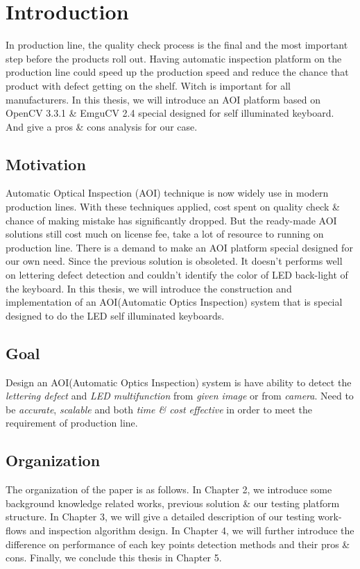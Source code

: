 \chapter{Introduction}
\label{c:intro}
	In production line, the quality check process is the final and the most important step before the
	products roll out.  
	Having automatic inspection platform on the production line could speed up the production speed and reduce the chance that product with defect getting on the shelf. 
	Witch is important for all manufacturers.
	In this thesis, we will introduce an AOI platform based on OpenCV 3.3.1 \& EmguCV 2.4 special designed for self illuminated keyboard.
	And give a pros \& cons analysis for our case.


\section{Motivation} \label{section:motivation} 
	Automatic Optical Inspection (AOI) technique is now widely use in modern production lines.
	With these techniques applied, cost spent on quality check \& chance of making mistake has significantly dropped.
	But the ready-made AOI solutions still cost much on license fee, take a lot of resource to running on production line.
	There is a demand to make an AOI platform special designed for our own need.
	Since the previous solution is obsoleted. It doesn't performs well on
	lettering defect detection and couldn't identify the color of LED back-light
	of the keyboard. In this thesis, we will introduce the construction and
	implementation of an AOI(Automatic Optics Inspection) system that is special
	designed to do the LED self illuminated keyboards.


\section{Goal}
\label{section:goal}
	Design an AOI(Automatic Optics Inspection) system is have ability to detect the \emph{lettering defect} and \emph{LED multifunction} from \emph{given image} or from \emph{camera}.
	Need to be \emph{accurate}, \emph{scalable} and both \emph{time \& cost effective} in order to meet the requirement of production line.

\section{Organization}
\label{section:organization}
	The organization of the paper is as follows. 
	In Chapter 2, we introduce some background knowledge related works, previous solution \& our testing platform structure.
	In Chapter 3, we will give a detailed description of our testing work-flows and inspection algorithm design.
	In Chapter 4, we will further introduce the difference on performance of each key points detection methods and their pros \& cons.
	Finally, we conclude this thesis in Chapter 5.

